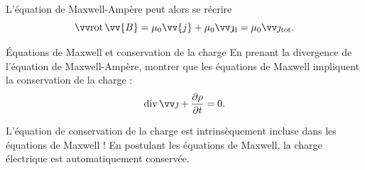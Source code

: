 \documentclass[12pt,fancy]{cours}
\begin{document}
L’équation de Maxwell-Ampère peut alors se récrire
\begin{equation}
\rot{\vv{B}}=\mu_0\vv{j}+\mu_0\jd = \mu_0\j_{\rm tot}.
\end{equation}


\begin{exemple}{Équations de Maxwell et conservation de la charge}
  En prenant la divergence de l'équation de Maxwell-Ampère, montrer que les équations de Maxwell impliquent la conservation de la charge :
   $$
   \dive{\j} + \frac{\partial \rho}{\partial t} = 0.
   $$
\end{exemple}
 L'équation de conservation de la charge est intrinsèquement incluse dans les équations de Maxwell ! En postulant les équations de Maxwell,  la charge électrique est automatiquement conservée.
\end{document}
